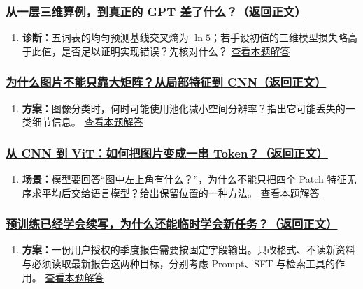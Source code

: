 \subsubsection*{\hyperref[check:23a-from-toy-to-gpt]{从一层三维算例，到真正的 GPT 差了什么？（返回正文）}}\begin{enumerate}[label={},leftmargin=4.8em,itemsep=4pt]
\item[\textbf{C4-32.}] \label{exercise:C4-32}\label{extension:23a-from-toy-to-gpt:4}\textbf{诊断：}五词表的均匀预测基线交叉熵为 $\ln5$；若手设初值的三维模型损失略高于此值，是否足以证明实现错误？先核对什么？ \hyperref[answerpiece:23a-from-toy-to-gpt:4]{查看本题解答}
\end{enumerate}

\subsubsection*{\hyperref[check:19-cnn]{为什么图片不能只靠大矩阵？从局部特征到 CNN（返回正文）}}\begin{enumerate}[label={},leftmargin=4.8em,itemsep=4pt]
\item[\textbf{C4-33.}] \label{exercise:C4-33}\label{extension:19-cnn:4}\textbf{方案：}图像分类时，何时可能使用池化减小空间分辨率？指出它可能丢失的一类细节信息。 \hyperref[answerpiece:19-cnn:4]{查看本题解答}
\end{enumerate}

\subsubsection*{\hyperref[check:19b-vit]{从 CNN 到 ViT：如何把图片变成一串 Token？（返回正文）}}\begin{enumerate}[label={},leftmargin=4.8em,itemsep=4pt]
\item[\textbf{C4-34.}] \label{exercise:C4-34}\label{extension:19b-vit:4}\textbf{场景：}模型要回答“图中左上角有什么？”，为什么不能只把四个 Patch 特征无序求平均后交给语言模型？给出保留位置的一种方法。 \hyperref[answerpiece:19b-vit:4]{查看本题解答}
\end{enumerate}

\subsubsection*{\hyperref[check:23aa-pretraining-icl]{预训练已经学会续写，为什么还能临时学会新任务？（返回正文）}}\begin{enumerate}[label={},leftmargin=4.8em,itemsep=4pt]
\item[\textbf{C4-35.}] \label{exercise:C4-35}\label{extension:23aa-pretraining-icl:4}\textbf{方案：}一份用户授权的季度报告需要按固定字段输出。只改格式、不读新资料与必须读取最新报告这两种目标，分别考虑 Prompt、SFT 与检索工具的作用。 \hyperref[answerpiece:23aa-pretraining-icl:4]{查看本题解答}
\end{enumerate}

